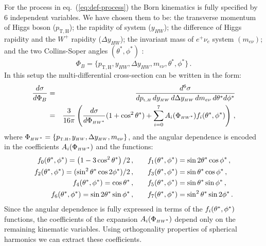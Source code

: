 For the process in eq.~(\ref{eq:def-process}) the Born kinematics is
fully specified by 6 independent variables. We have chosen them to be:
the transverse momentum of Higgs boson
($p_{\scriptscriptstyle\mathrm{T,H}}$); the rapidity of \HW{} system
($y_{\scriptscriptstyle HW}$); the difference of Higgs rapidity and
the $W^{+}$ rapidity ($\Delta y_{\scriptscriptstyle HW}$); the
invariant mass of $e^{+}\nu_{e}$ system $(m_{e\nu})$; and the two
Collins-Soper angles $(\theta^{*},\phi^{*})$ \cite{Collins:1977iv}:
\begin{equation}
  \Phi_{B} = \lbrace p_{\scriptscriptstyle\mathrm{T,H}}, y_{\scriptscriptstyle HW}, \Delta y_{\scriptscriptstyle HW}, m_{e\nu},
      \theta^{*}, \phi^{*}  \rbrace\,.
\end{equation}
In this setup the multi-differential cross-section can be written in the form:
\begin{eqnarray}
\label{eq:sigma}
\frac{d\sigma}{d\Phi_B}  &=& 
\frac{d^6\sigma}{dp_{\scriptscriptstyle\mathrm{t},H}\,dy_{\scriptscriptstyle HW}\, d\Delta y_{\scriptscriptstyle HW}\, dm_{e\nu}\, d\theta^* d\phi^*} \nonumber \\
&=&  \frac{3}{16\pi}  \left ( 
\frac{d \sigma}{d\Phi_{\scriptscriptstyle HW^*}}(1+\cos^2\theta^*) + \sum_{i=0}^{7} A_i(\Phi_{\scriptscriptstyle HW^*} ) f_i(\theta^*, \phi^*)
\right)\,,  
\end{eqnarray}
where $\Phi_{\scriptscriptstyle HW^*} =\lbrace p_{\scriptscriptstyle\mathrm{T,H}}, y_{\scriptscriptstyle HW}, \Delta y_{\scriptscriptstyle HW},
m_{e\nu}\rbrace$, and the angular dependence is encoded in
the coefficients $A_{i}(\Phi_{\scriptscriptstyle HW^*})$ and the functions:
\begin{eqnarray}
\label{eq:f}
f_0(\theta^*,\phi^*) = \left(1-3\cos^2\theta^*\right)/2\,,\qquad & 
f_1(\theta^*,\phi^*) = \sin2\theta^* \cos\phi^*\,, \nonumber\\
f_2(\theta^*,\phi^*) = (\sin^2\theta^* \cos2\phi^*)/2\,, \qquad& 
f_3(\theta^*,\phi^*) = \sin\theta^* \cos\phi^*\,, \nonumber\\ 
f_4(\theta^*,\phi^*) = \cos\theta^*\,, \qquad &
f_5(\theta^*,\phi^*) = \sin\theta^* \sin \phi^*\,, \nonumber\\ 
f_6(\theta^*,\phi^*) = \sin 2\theta^* \sin \phi^*\,, \qquad& 
f_7(\theta^*,\phi^*) = \sin^2\theta^* \sin 2\phi^*\,.  
\end{eqnarray}
Since the angular dependence is fully expressed in terms of the
$f_i(\theta^*,\phi^*)$ functions, the coefficients of the expansion
$A_i(\Phi_{\scriptscriptstyle HW^*})$ depend only on the remaining kinematic variables. Using
orthogonality properties of spherical harmonics we can extract these
coefficients.

